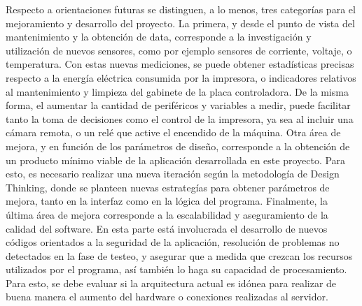 Respecto a orientaciones futuras se distinguen, a lo menos, tres categorías para el mejoramiento y desarrollo del proyecto. La primera, y desde el punto de vista del mantenimiento y la obtención de data, corresponde a la investigación y utilización de nuevos sensores, como por ejemplo sensores de corriente, voltaje, o temperatura. Con estas nuevas mediciones, se puede obtener estadísticas precisas respecto a la energía eléctrica consumida por la impresora, o indicadores relativos al mantenimiento y limpieza del gabinete de la placa controladora. De la misma forma, el aumentar la cantidad de periféricos y variables a medir, puede facilitar tanto la toma de decisiones como el control de la impresora, ya sea al incluir una cámara remota, o un relé que active el encendido de la máquina. Otra área de mejora, y en función de los parámetros de diseño, corresponde a la obtención de un producto mínimo viable de la aplicación desarrollada en este proyecto. Para esto, es necesario realizar una nueva iteración según la metodología de Design Thinking, donde se planteen nuevas estrategías para obtener parámetros de mejora, tanto en la interfaz como en la lógica del programa. Finalmente, la última área de mejora corresponde a la escalabilidad y aseguramiento de la calidad del software. En esta parte está involucrada el desarrollo de nuevos códigos orientados a la seguridad de la aplicación, resolución de problemas no detectados en la fase de testeo, y asegurar que a medida que crezcan los recursos utilizados por el programa, así también lo haga su capacidad de procesamiento. Para esto, se debe evaluar si la arquitectura actual es idónea para realizar de buena manera el aumento del hardware o conexiones realizadas al servidor.